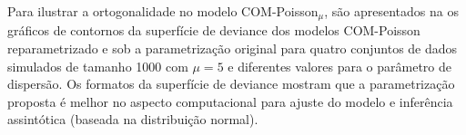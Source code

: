 \documentclass[
    oldfontcommands,
    11pt,
    openright,
    twoside,
    a4paper,
    english,
    brazil
]{abntex2}\usepackage[]{graphicx}\usepackage[]{color}
\begin{document}
Para ilustrar a ortogonalidade no modelo COM-Poisson$_\mu$, são
apresentados na  os gráficos de contornos da
superfície de deviance dos modelos COM-Poisson reparametrizado e sob a
parametrização original para quatro conjuntos de dados simulados de
tamanho 1000 com $\mu=5$ e diferentes valores para o parâmetro de
dispersão. Os formatos da superfície de deviance mostram que a
parametrização proposta é melhor no aspecto computacional para ajuste do
modelo e inferência assintótica (baseada na distribuição normal).

\postextual


\end{document}
